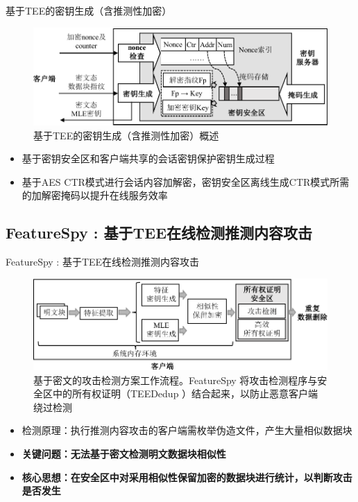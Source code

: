 \documentclass{beamer}
\newcommand{\sysnameS}{TEEDedup }
\newcommand{\sysnameF}{FeatureSpy }
\begin{document}
\begin{frame}{基于TEE的密钥生成（含推测性加密）}
    \begin{figure}[!htb]
        \centering
        \includegraphics[width=\textwidth]{../pic/sgxdedup/key-enclave-arch.pdf}
        \caption{基于TEE的密钥生成（含推测性加密）概述}
        \label{fig:sgxdedup-SpecEnc}
    \end{figure}
    \vspace{-1em}
    \begin{itemize}
        \item  基于密钥安全区和客户端共享的会话密钥保护密钥生成过程
        \item 基于AES CTR模式进行会话内容加解密，密钥安全区离线生成CTR模式所需的加解密掩码以提升在线服务效率
    \end{itemize}
\end{frame}

\subsection{\sysnameF: 基于TEE在线检测推测内容攻击}

\begin{frame}{\sysnameF: 基于TEE在线检测推测内容攻击}
    \begin{figure}[!htb]
        \centering
        \includegraphics[width=\textwidth]{../pic/featurespy/architecture.pdf}
        \caption{基于密文的攻击检测方案工作流程。\sysnameF 将攻击检测程序与安全区中的所有权证明（\sysnameS ）结合起来，以防止恶意客户端绕过检测}
        \label{fig:featurespy-architecture-secure}
    \end{figure}
    \vspace{-1em}
    \begin{itemize}
        \item 检测原理：执行推测内容攻击的客户端需枚举伪造文件，产生大量相似数据块
        \item {\bf 关键问题：无法基于密文检测明文数据块相似性}
        \item {\bf 核心思想：在安全区中对采用相似性保留加密的数据块进行统计，以判断攻击是否发生}
    \end{itemize}
\end{frame}
\end{document}
